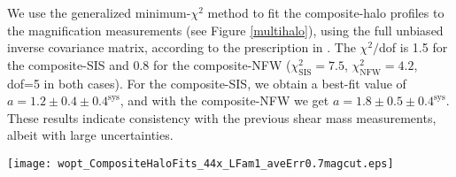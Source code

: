 \documentclass[iop]{emulateapj}
\begin{document}
We use the generalized minimum-$\chi^2$ method to fit the composite-halo profiles to the magnification measurements (see Figure \ref{multihalo}), using the full unbiased inverse covariance matrix, according to the prescription in \citet{Hartlap07}. The $\chi^2/$dof is 1.5 for the composite-SIS and 0.8 for the composite-NFW ($\chi_{\text{SIS}}^2=7.5$, $\chi_{\text{NFW}}^2=4.2$, dof=5 in both cases). For the composite-SIS, we obtain a best-fit value of $a=1.2 \pm 0.4 \pm 0.4^{\text{sys}}$, and with the composite-NFW we get $a=1.8 \pm 0.5 \pm 0.4^{\text{sys}}$. These results indicate consistency with the previous shear mass measurements, albeit with large uncertainties.




\begin{figure*}
\begin{center}
\texttt{[image: wopt\_CompositeHaloFits\_44x\_LFam1\_aveErr0.7magcut.eps]}
\caption{Composite-halo fits to the optimally weighted correlation function, using the LBG background source sample. The significance of the magnification detection is 4.9$\sigma$. The dashed line is the composite-SIS and the solid line is the composite-NFW.  We find the best-fit relative scaling relations for each to be $a= M_{\text{mag}}/M_{\text{shear}}= 1.2 \pm 0.4 \pm 0.4^{\text{sys}}$ (SIS) and $a= 1.8 \pm 0.5 \pm 0.4^{\text{sys}}$ (NFW). The dotted line shows the prediction from the shear measured values of $M_{200}$ (A. Leauthaud 2011, private communication).}
\label{multihalo}
\end{center}
\end{figure*}
\end{document}

